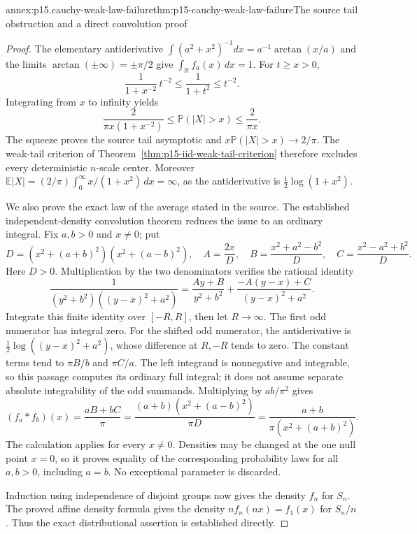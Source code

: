 \begin{annexitem}{annex:p15.cauchy-weak-law-failure}{thm:p15-cauchy-weak-law-failure}{The source tail obstruction and a direct convolution proof}
\begin{proof}
The elementary antiderivative
\(\int (a^2+x^2)^{-1}dx=a^{-1}\arctan(x/a)\) and the
limits \(\arctan(\pm\infty)=\pm\pi/2\) give
\(\int_{\mathbb R}f_a(x)\,dx=1\).
For \(t\geq x>0\),
\[
 \frac{1}{1+x^{-2}}\,t^{-2}
       \leq\frac1{1+t^2}\leq t^{-2}.
\]
Integrating from \(x\) to infinity yields
\[
 \frac{2}{\pi x(1+x^{-2})}
 \leq \mathbb P(|X|>x)\leq\frac2{\pi x}.
\]
The squeeze proves the source tail asymptotic and
\(x\mathbb P(|X|>x)\to2/\pi\).
The weak-tail criterion of
Theorem~\ref{thm:p15-iid-weak-tail-criterion} therefore excludes
every deterministic \(n\)-scale center. Moreover
\(\mathbb E|X|=(2/\pi)\int_0^\infty x/(1+x^2)\,dx=\infty\),
as the antiderivative is \(\tfrac12\log(1+x^2)\).

We also prove the exact law of the average stated in the source.
The established independent-density convolution theorem reduces
the issue to an ordinary integral. Fix \(a,b>0\) and \(x\ne0\);
put
\[
 D=(x^2+(a+b)^2)(x^2+(a-b)^2),\quad
 A=\frac{2x}{D},\quad
 B=\frac{x^2+a^2-b^2}{D},\quad
 C=\frac{x^2-a^2+b^2}{D}.
\]
Here \(D>0\). Multiplication by the two denominators verifies
the rational identity
\[
 \frac1{(y^2+b^2)((y-x)^2+a^2)}
 =\frac{Ay+B}{y^2+b^2}
   +\frac{-A(y-x)+C}{(y-x)^2+a^2}.
\]
Integrate this finite identity over \([-R,R]\), then let
\(R\to\infty\). The first odd numerator has integral zero.
For the shifted odd numerator, the antiderivative is
\(\tfrac12\log((y-x)^2+a^2)\), whose difference at
\(R,-R\) tends to zero. The constant terms tend to
\(\pi B/b\) and \(\pi C/a\). The left integrand is
nonnegative and integrable, so this passage computes its
ordinary full integral; it does not assume separate absolute
integrability of the odd summands.
Multiplying by \(ab/\pi^2\) gives
\[
 (f_a*f_b)(x)=\frac{aB+bC}{\pi}
 =\frac{(a+b)(x^2+(a-b)^2)}{\pi D}
 =\frac{a+b}{\pi(x^2+(a+b)^2)}.
\]
The calculation applies for every \(x\ne0\). Densities may be
changed at the one null point \(x=0\), so it proves equality
of the corresponding probability laws for all \(a,b>0\),
including \(a=b\). No exceptional parameter is discarded.

Induction using independence of disjoint groups now gives
the density \(f_n\) for \(S_n\). The proved affine density
formula gives the density \(n f_n(nx)=f_1(x)\) for \(S_n/n\).
Thus the exact distributional assertion is established directly.
\end{proof}
\end{annexitem}

